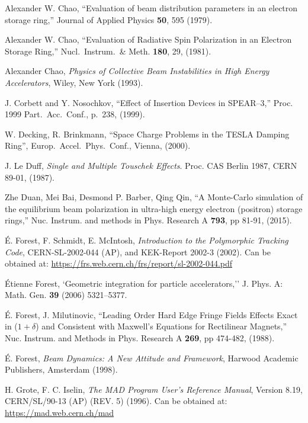 \begin{thebibliography}{XXXXXXX99}
Alexander W. Chao, 
``Evaluation of beam distribution parameters in an electron storage ring,''
Journal of Applied Physics {\bf 50}, 595 (1979).

Alexander W. Chao, 
``Evaluation of Radiative Spin Polarization in an Electron Storage Ring,''
Nucl.\ Instrum.\ \& Meth. {\bf 180}, 29, (1981).

Alexander Chao, 
{\em Physics of Collective Beam Instabilities in High Energy Accelerators}, 
Wiley, New York (1993). 

J. Corbett and Y. Nosochkov, ``Effect of Insertion Devices in SPEAR--3,''
Proc. 1999 Part.\ Acc.\ Conf., p.~238, (1999).

W. Decking, R. Brinkmann, 
``Space Charge Problems in the TESLA Damping Ring'',
Europ.\ Accel.\ Phys.\ Conf., Vienna, (2000).

  J. Le Duff, \emph{Single and Multiple Touschek Effects}.
  Proc. CAS Berlin 1987,
  CERN 89-01, (1987).

 Zhe Duan, Mei Bai, Desmond P. Barber, Qing Qin, 
``A Monte-Carlo simulation of the equilibrium beam polarization in ultra-high energy electron
(positron) storage rings,''
Nuc. Instrum. and methods in Phys. Research A {\bf 793}, pp 81-91, (2015).

\'E. Forest, F. Schmidt, E. McIntosh, 
{\it Introduction to the Polymorphic Tracking Code}, 
CERN-SL-2002-044 (AP), and KEK-Report 2002-3 (2002). 
Can be obtained at:
\hfill\break
\hspace*{0.3in}
\url{https://frs.web.cern.ch/frs/report/sl-2002-044.pdf}

\'Etienne Forest, `Geometric integration for particle accelerators,''
J. Phys. A: Math. Gen. {\bf 39} (2006) 5321–5377.

\'E. Forest, J. Milutinovic, 
``Leading Order Hard Edge Fringe Fields Effects Exact in ($1+\delta$) and 
Consistent with Maxwell's Equations for Rectilinear Magnets,''
Nuc. Instrum. and Methods in Phys. Research A {\bf 269}, pp 474-482, (1988).

\'E. Forest, {\em Beam Dynamics: A New Attitude and Framework},
Harwood Academic Publishers, Amsterdam (1998).


H. Grote, F. C. Iselin, {\it The MAD Program User's Reference Manual},
Version 8.19, CERN/SL/90-13 (AP) (REV. 5) (1996). 
Can be obtained at:
\hfill\break
\hspace*{0.3in}
\url{https://mad.web.cern.ch/mad} 


\end{thebibliography}
